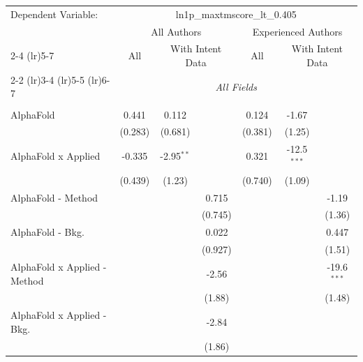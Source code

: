 \begingroup
\centering
\begin{tabular}{lcccccc}
   \tabularnewline \midrule \midrule
   Dependent Variable: & \multicolumn{6}{c}{ln1p\_maxtmscore\_lt\_0.405}\\
 & \multicolumn{3}{c}{All Authors} & \multicolumn{3}{c}{Experienced Authors} \\
\cmidrule(lr){2-4} \cmidrule(lr){5-7}
 & \multicolumn{1}{c}{All} & \multicolumn{2}{c}{With Intent Data} & \multicolumn{1}{c}{All} & \multicolumn{2}{c}{With Intent Data} \\
\cmidrule(lr){2-2} \cmidrule(lr){3-4} \cmidrule(lr){5-5} \cmidrule(lr){6-7}
 & \multicolumn{6}{c}{\textit{All Fields}} \\ \\
   AlphaFold                      & 0.441         & 0.112        &               & 0.124   & -1.67         &   \\   
                                  & (0.283)       & (0.681)      &               & (0.381) & (1.25)        &   \\   
   AlphaFold x Applied            & -0.335        & -2.95$^{**}$ &               & 0.321   & -12.5$^{***}$ &   \\   
                                  & (0.439)       & (1.23)       &               & (0.740) & (1.09)        &   \\   
   AlphaFold - Method             &               &              & 0.715         &         &               & -1.19\\   
                                  &               &              & (0.745)       &         &               & (1.36)\\   
   AlphaFold - Bkg.               &               &              & 0.022         &         &               & 0.447\\   
                                  &               &              & (0.927)       &         &               & (1.51)\\   
   AlphaFold x Applied - Method   &               &              & -2.56         &         &               & -19.6$^{***}$\\   
                                  &               &              & (1.88)        &         &               & (1.48)\\   
   AlphaFold x Applied - Bkg.     &               &              & -2.84         &         &               &   \\   
                                  &               &              & (1.86)        &         &               &   \\   

\end{tabular}

